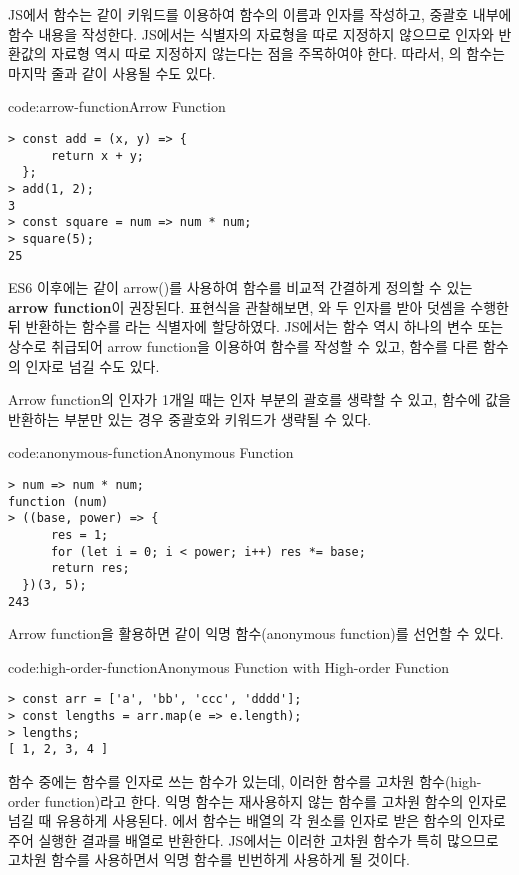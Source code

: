 JS에서 함수는 \과 같이  키워드를 이용하여 함수의 이름과 인자를 작성하고, 중괄호 내부에 함수 내용을 작성한다. JS에서는 식별자의 자료형을 따로 지정하지 않으므로 인자와 반환값의 자료형 역시 따로 지정하지 않는다는 점을 주목하여야 한다. 따라서, 의 함수는 마지막 줄과 같이 사용될 수도 있다.

\begin{codeenv}{code:arrow-function}{Arrow Function}\begin{verbatim}
> const add = (x, y) => {
      return x + y;
  };
> add(1, 2);
3
> const square = num => num * num;
> square(5);
25
\end{verbatim}
\end{codeenv}
\clearpage

ES6 이후에는 \과 같이 arrow(\cd{=>})를 사용하여 함수를 비교적 간결하게 정의할 수 있는 \textbf{arrow function}이 권장된다. 표현식을 관찰해보면, 와  두 인자를 받아 덧셈을 수행한 뒤 반환하는 함수를 라는 식별자에 할당하였다. JS에서는 함수 역시 하나의 변수 또는 상수로 취급되어 arrow function을 이용하여 함수를 작성할 수 있고, 함수를 다른 함수의 인자로 넘길 수도 있다.

Arrow function의 인자가 1개일 때는 인자 부분의 괄호를 생략할 수 있고, 함수에 값을 반환하는 부분만 있는 경우 중괄호와  키워드가 생략될 수 있다.

\begin{codeenv}{code:anonymous-function}{Anonymous Function}\begin{verbatim}
> num => num * num;
function (num)
> ((base, power) => {
      res = 1;
      for (let i = 0; i < power; i++) res *= base;
      return res;
  })(3, 5);
243
\end{verbatim}
\end{codeenv}

Arrow function을 활용하면 \과 같이 익명 함수(anonymous function)를 선언할 수 있다.

\begin{codeenv}{code:high-order-function}{Anonymous Function with High-order Function}\begin{verbatim}
> const arr = ['a', 'bb', 'ccc', 'dddd'];
> const lengths = arr.map(e => e.length);
> lengths;
[ 1, 2, 3, 4 ]
\end{verbatim}
\end{codeenv}

함수 중에는 함수를 인자로 쓰는 함수가 있는데, 이러한 함수를 고차원 함수(high-order function)라고 한다. 익명 함수는 재사용하지 않는 함수를 고차원 함수의 인자로 넘길 때 유용하게 사용된다. 에서  함수는 배열의 각 원소를 인자로 받은 함수의 인자로 주어 실행한 결과를 배열로 반환한다. JS에서는 이러한 고차원 함수가 특히 많으므로 고차원 함수를 사용하면서 익명 함수를 빈번하게 사용하게 될 것이다.

